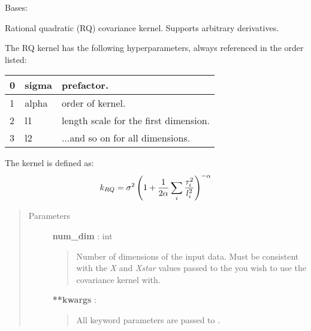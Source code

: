 \documentclass[letterpaper,10pt,english]{sphinxmanual}
\begin{document}
\begin{fulllineitems}
\label{gptools.kernel:gptools.kernel.rational_quadratic.RationalQuadraticKernel}
Bases: {\hyperref[gptools.kernel:gptools.kernel.core.ChainRuleKernel]{}}

Rational quadratic (RQ) covariance kernel. Supports arbitrary derivatives.

The RQ kernel has the following hyperparameters, always referenced
in the order listed:

\begin{tabulary}{\linewidth}{|L|L|L|}
\hline

0
 & 
sigma
 & 
prefactor.
\\\hline

1
 & 
alpha
 & 
order of kernel.
\\\hline

2
 & 
l1
 & 
length scale for the first dimension.
\\\hline

3
 & 
l2
 & 
...and so on for all dimensions.
\\\hline
\end{tabulary}


The kernel is defined as:
\begin{gather}
\begin{split}k_{RQ} = \sigma^2 \left(1 + \frac{1}{2\alpha} \sum_i\frac{\tau_i^2}{l_i^2}\right)^{-\alpha}\end{split}\notag
\end{gather}\begin{quote}\begin{description}
\item[{Parameters }] \leavevmode
\textbf{num\_dim} : int
\begin{quote}

Number of dimensions of the input data. Must be consistent
with the \emph{X} and \emph{Xstar} values passed to the
{\hyperref[gptools:gptools.gaussian_process.GaussianProcess]{}} you
wish to use the covariance kernel with.
\end{quote}

\textbf{**kwargs} :
\begin{quote}

All keyword parameters are passed to {\hyperref[gptools.kernel:gptools.kernel.core.ChainRuleKernel]{}}.
\end{quote}


\end{description}
\end{quote}
\end{fulllineitems}
\end{document}
